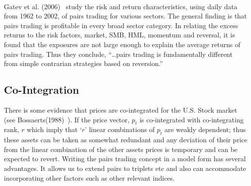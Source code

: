 \noindent{} \\

Gatev et al. (2006)~\cite{ggr} study the risk and return characteristics, using daily data from 1962 to 2002, of pairs trading for various sectors. The general finding is that pairs trading is profitable in every broad sector category. In relating the excess returns to the risk factors, market, SMB, HML, momentum and reversal, it is found that the exposures are not large enough to explain the average returns of pairs trading. Thus they conclude, ``\dots pairs trading is fundamentally different from simple contrarian strategies based on reversion.''


\subsection{Co-Integration}


There is some evidence that prices are co-integrated for the U.S. Stock market (see Bossaerts(1988)~\cite{bossaerts1988common}). If the price vector, $p_t$ is co-integrated with co-integrating rank, $r$ which imply that `$r$' linear combinations of $p_t$ are weakly dependent; thus these assets can be taken as somewhat redundant and any deviation of their price from the linear combination of the other assets prices is temporary and can be expected to revert. Writing the pairs trading concept in a model form has several advantages. It allows us to extend pairs to triplets etc and also can accommodate incorporating other factors such as other relevant indices.


